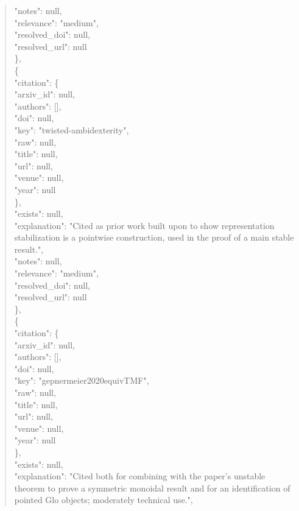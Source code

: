 \documentclass[11pt]{article}
\begin{document}
\begin{quote}
      "notes": null,\\
      "relevance": "medium",\\
      "resolved\_doi": null,\\
      "resolved\_url": null\\
    \},\\
    \{\\
      "citation": \{\\
        "arxiv\_id": null,\\
        "authors": [],\\
        "doi": null,\\
        "key": "twisted-ambidexterity",\\
        "raw": null,\\
        "title": null,\\
        "url": null,\\
        "venue": null,\\
        "year": null\\
      \},\\
      "exists": null,\\
      "explanation": "Cited as prior work built upon to show representation stabilization is a pointwise construction, used in the proof of a main stable result.",\\
      "notes": null,\\
      "relevance": "medium",\\
      "resolved\_doi": null,\\
      "resolved\_url": null\\
    \},\\
    \{\\
      "citation": \{\\
        "arxiv\_id": null,\\
        "authors": [],\\
        "doi": null,\\
        "key": "gepnermeier2020equivTMF",\\
        "raw": null,\\
        "title": null,\\
        "url": null,\\
        "venue": null,\\
        "year": null\\
      \},\\
      "exists": null,\\
      "explanation": "Cited both for combining with the paper's unstable theorem to prove a symmetric monoidal result and for an identification of pointed Glo objects; moderately technical use.",\\

\end{quote}
\end{document}
